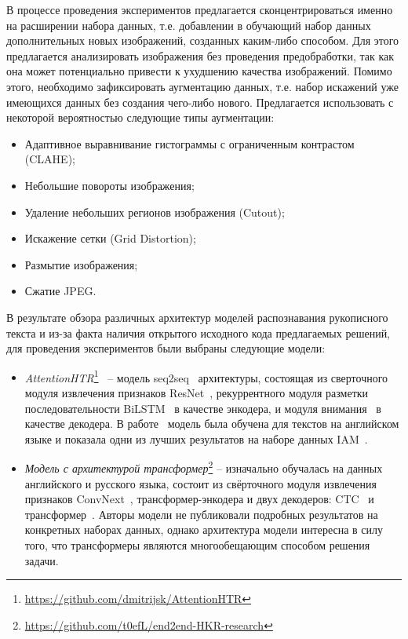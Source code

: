 В процессе проведения экспериментов предлагается сконцентрироваться именно на расширении набора данных,
т.е. добавлении в обучающий набор данных дополнительных новых изображений, созданных каким-либо способом.
Для этого предлагается анализировать изображения без проведения предобработки, так как она может потенциально привести к ухудшению качества изображений.
Помимо этого, необходимо зафиксировать аугментацию данных, т.е. набор искажений уже имеющихся данных без создания чего-либо нового.
Предлагается использовать с некоторой вероятностью следующие типы аугментации:
\begin{itemize}
    \item Адаптивное выравнивание гистограммы с ограниченным контрастом (CLAHE);
    \item Небольшие повороты изображения;
    \item Удаление небольших регионов изображения (Cutout);
    \item Искажение сетки (Grid Distortion);
    \item Размытие изображения;
    \item Сжатие JPEG.
\end{itemize}

В результате обзора различных архитектур моделей распознавания рукописного текста и из-за факта наличия открытого исходного
кода предлагаемых решений, для проведения экспериментов были выбраны следующие модели:
\begin{itemize}
    \item \textit{AttentionHTR}\footnote{\url{https://github.com/dmitrijsk/AttentionHTR}}~\cite{kass2022attentionhtr} --
    модель seq2seq~\cite{sutskever2014sequence} архитектуры, состоящая из сверточного модуля извлечения признаков ResNet~\cite{he2016deep},
    рекуррентного модуля разметки последовательности BiLSTM~\cite{hochreiter1997long} в качестве энкодера, и модуля внимания~\cite{bahdanau2014neural} в качестве декодера.
    В работе~\cite{kass2022attentionhtr} модель была обучена для текстов на английском языке и показала одни из лучших результатов на наборе данных IAM~\cite{marti2002iam}.
    \item \textit{Модель с архитектурой трансформер}\footnote{\url{https://github.com/t0efL/end2end-HKR-research}} --
    изначально обучалась на данных английского и русского языка, состоит из свёрточного модуля извлечения признаков ConvNext~\cite{liu2022convnet},
    трансформер-энкодера и двух декодеров: CTC~\cite{graves2006connectionist} и трансформер~\cite{vaswani2017attention}.
    Авторы модели не публиковали подробных результатов на конкретных наборах данных, однако архитектура модели интересна
    в силу того, что трансформеры являются многообещающим способом решения задачи.
\end{itemize}

